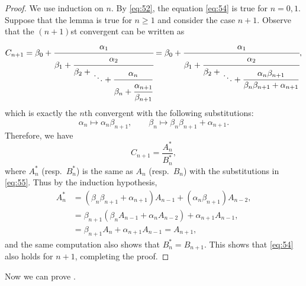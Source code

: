 \documentclass[oneside]{book}
\numberwithin{equation}{section}
\theoremstyle{definition}
\begin{document}
\begin{proof}
  We use induction on \( n \). By \eqref{eq:52}, the equation
  \eqref{eq:54} is true for \( n=0,1 \). Suppose that the lemma is true
  for \( n\ge1 \) and consider the case \( n+1 \). Observe that
  the \( (n+1) \)st convergent can be written as
  \[
   C_{n+1} = \beta_0+\cfrac{\alpha_1}{
      \beta_1 + \cfrac{\alpha_2}{
        \beta_2 \displaystyle+ \genfrac{}{}{0pt}{0}{}{\ddots +
          \cfrac{\alpha_{n}}{\beta_{n} + \cfrac{\alpha_{n+1}}{\beta_{n+1}}}}}}
    =\beta_0+\cfrac{\alpha_1}{
      \beta_1 + \cfrac{\alpha_2}{
        \beta_2 \displaystyle+ \genfrac{}{}{0pt}{0}{}{\ddots +
          \cfrac{\alpha_{n}\beta_{n+1}}{\beta_{n}\beta_{n+1} + \alpha_{n+1}}}}},
  \]
  which is exactly the \( n \)th convergent with the following
  substitutions:
  \begin{equation}\label{eq:55}
    \alpha_{n} \mapsto \alpha_{n}\beta_{n+1}, \qquad \beta_n \mapsto
    \beta_{n}\beta_{n+1} + \alpha_{n+1}.
  \end{equation}
  Therefore, we have
  \[
    C_{n+1} = \frac{A^*_n}{B^*_n},
  \]
  where \( A^*_n \) (resp.~\( B^*_n \)) is the same as \( A_n \)
  (resp.~\( B_n \)) with the substitutions in \eqref{eq:55}. Thus by
  the induction hypothesis,
  \begin{align*}
    A^*_n &= (\beta_{n}\beta_{n+1} + \alpha_{n+1}) A_{n-1} + (\alpha_{n}\beta_{n+1}) A_{n-2},\\
          &= \beta_{n+1}(\beta_n A_{n-1} + \alpha_n A_{n-2}) + \alpha_{n+1} A_{n-1},\\
          &= \beta_{n+1}A_{n} + \alpha_{n+1} A_{n-1} = A_{n+1},
  \end{align*}
  and the same computation also shows that \( B^*_n = B_{n+1} \). This
  shows that \eqref{eq:54} also holds for \( n+1 \), completing the proof.
\end{proof}

Now we can prove .
\end{document}

